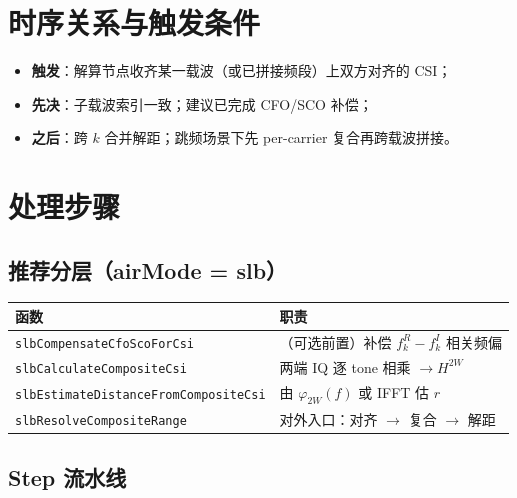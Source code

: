 \documentclass[11pt,a4paper]{ctexart}
\begin{document}
\section{时序关系与触发条件}

\begin{itemize}[nosep]
  \item \textbf{触发}：解算节点收齐某一载波（或已拼接频段）上双方对齐的 CSI；
  \item \textbf{先决}：子载波索引一致；建议已完成 CFO/SCO 补偿；
  \item \textbf{之后}：跨 $k$ 合并解距；跳频场景下先 per-carrier 复合再跨载波拼接。
\end{itemize}

\section{处理步骤}

\subsection{推荐分层（airMode = slb）}

\begin{table}[h]
\centering
\small
\begin{tabular}{L{5cm}L{8cm}}
\toprule
\textbf{函数} & \textbf{职责} \\
\midrule
\texttt{slbCompensateCfoScoForCsi} & （可选前置）补偿 $f_k^{R}-f_k^{I}$ 相关频偏 \\
\texttt{slbCalculateCompositeCsi} & 两端 IQ 逐 tone 相乘 $\rightarrow H^{2W}$ \\
\texttt{slbEstimateDistanceFromCompositeCsi} & 由 $\varphi_{2W}(f)$ 或 IFFT 估 $r$ \\
\texttt{slbResolveCompositeRange} & 对外入口：对齐 $\rightarrow$ 复合 $\rightarrow$ 解距 \\
\bottomrule
\end{tabular}
\end{table}

\subsection{Step 流水线}
\end{document}
